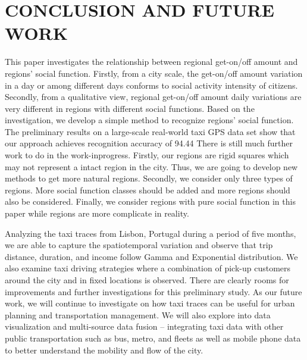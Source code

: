 \documentclass[a4paper, 10pt, conference]{ieeeconf}      %
\begin{document}
\section{CONCLUSION AND FUTURE WORK}%
This paper investigates the relationship between regional get-on/off amount and regions’ social function. Firstly, from a city scale, the get-on/off amount variation in a day or among different days conforms to social activity intensity of citizens. Secondly, from a qualitative view, regional get-on/off amount daily variations are very different in regions with different social functions.
Based on the investigation, we develop a simple method to recognize regions’ social function. The preliminary results on a large-scale real-world taxi GPS data set show that our approach achieves recognition accuracy of 94.44%
There is still much further work to do in the work-inprogress. Firstly, our regions are rigid squares which may not represent a intact region in the city. Thus, we are going to develop new methods to get more natural regions. Secondly, we consider only three types of regions. More social function classes should be added and more regions should also be considered. Finally, we consider regions with pure social function in this paper while regions are more complicate in reality.

Analyzing the taxi traces from Lisbon, Portugal during a period of five months, we are able to capture the spatiotemporal variation and observe that trip distance, duration, and income follow Gamma and Exponential distribution. We also examine taxi driving strategies where a combination of pick-up customers around the city and in fixed locations is observed. There are clearly rooms for improvements and further investigations for this preliminary study. As our future work, we will continue to investigate on how taxi traces can be useful for urban planning and transportation management. We will also explore into data visualization and multi-source data fusion – integrating taxi data with other public transportation such as bus, metro, and fleets as well as mobile phone data to better understand the mobility and flow of the city. 

\addtolength{\textheight}{-12cm}   %
\end{document}
